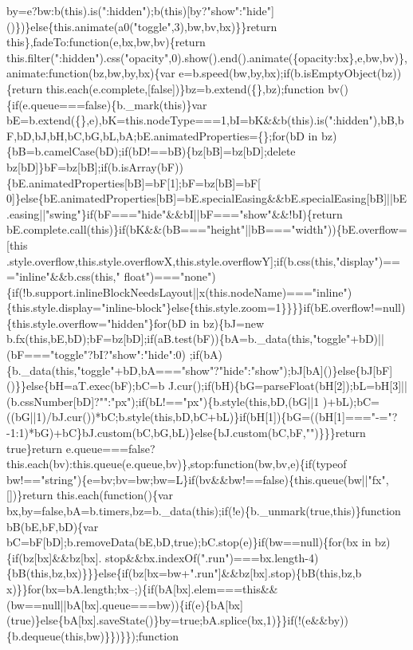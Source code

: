 \begin{DoxyCode}
{       by=e?bw:b(this).is(":hidden");b(this)[by?"show":"hide"]()\})\}else\{this.animate(a0("toggle",3),bw,bv,bx)\}\}return
       this\},fadeTo:function(e,bx,bw,bv)\{return
       this.filter(":hidden").css("opacity",0).show().end().animate(\{opacity:bx\},e,bw,bv)\},animate:function(bz,bw,by,bx)\{var e=b.speed(bw,by,bx);if(b.isEmptyObject(bz))\{return
       this.each(e.complete,[false])\}bz=b.extend(\{\},bz);function bv()\{if(e.queue===false)\{b.\_mark(this)\}var
       bE=b.extend(\{\},e),bK=this.nodeType===1,bI=bK&&b(this).is(":hidden"),bB,bF,bD,bJ,bH,bC,bG,bL,bA;bE.animatedProperties=\{\};for(bD in
       bz)\{bB=b.camelCase(bD);if(bD!==bB)\{bz[bB]=bz[bD];delete
       bz[bD]\}bF=bz[bB];if(b.isArray(bF))\{bE.animatedProperties[bB]=bF[1];bF=bz[bB]=bF[
      0]\}else\{bE.animatedProperties[bB]=bE.specialEasing&&bE.specialEasing[bB]||bE.easing||"swing"\}if(bF==="hide"&&bI||bF==="show"&&!bI)\{return
       bE.complete.call(this)\}if(bK&&(bB==="height"||bB==="width"))\{bE.overflow=[this
      .style.overflow,this.style.overflowX,this.style.overflowY];if(b.css(this,"display")==="inline"&&b.css(this,"
      float")==="none")\{if(!b.support.inlineBlockNeedsLayout||x(this.nodeName)==="inline")\{this.style.display="inline-block"\}else\{this.style.zoom=1\}\}\}\}if(bE.overflow!=null)\{this.style.overflow="hidden"\}for(bD in
       bz)\{bJ=new
       b.fx(this,bE,bD);bF=bz[bD];if(aB.test(bF))\{bA=b.\_data(this,"toggle"+bD)||(bF==="toggle"?bI?"show":"hide":0)
      ;if(bA)\{b.\_data(this,"toggle"+bD,bA==="show"?"hide":"show");bJ[bA]()\}else\{bJ[bF]()\}\}else\{bH=aT.exec(bF);bC=b
      J.cur();if(bH)\{bG=parseFloat(bH[2]);bL=bH[3]||(b.cssNumber[bD]?"":"px");if(bL!=="px")\{b.style(this,bD,(bG||1
      )+bL);bC=((bG||1)/bJ.cur())*bC;b.style(this,bD,bC+bL)\}if(bH[1])\{bG=((bH[1]==="-="?-1:1)*bG)+bC\}bJ.custom(bC,bG,bL)\}else\{bJ.custom(bC,bF,"")\}\}\}return true\}return
       e.queue===false?this.each(bv):this.queue(e.queue,bv)\},stop:function(bw,bv,e)\{if(typeof
       bw!=="string")\{e=bv;bv=bw;bw=L\}if(bv&&bw!==false)\{this.queue(bw||"fx",[])\}return this.each(function()\{var bx,by=false,bA=b.timers,bz=b.\_data(this);if(!e)\{b.\_unmark(true,this)\}function
       bB(bE,bF,bD)\{var bC=bF[bD];b.removeData(bE,bD,true);bC.stop(e)\}if(bw==null)\{for(bx in
       bz)\{if(bz[bx]&&bz[bx].
      stop&&bx.indexOf(".run")===bx.length-4)\{bB(this,bz,bx)\}\}\}else\{if(bz[bx=bw+".run"]&&bz[bx].stop)\{bB(this,bz,b
      x)\}\}for(bx=bA.length;bx--;)\{if(bA[bx].elem===this&&(bw==null||bA[bx].queue===bw))\{if(e)\{bA[bx](true)\}else\{bA[bx].saveState()\}by=true;bA.splice(bx,1)\}\}if(!(e&&by))\{b.dequeue(this,bw)\}\})\}\});function
}
\end{DoxyCode}

